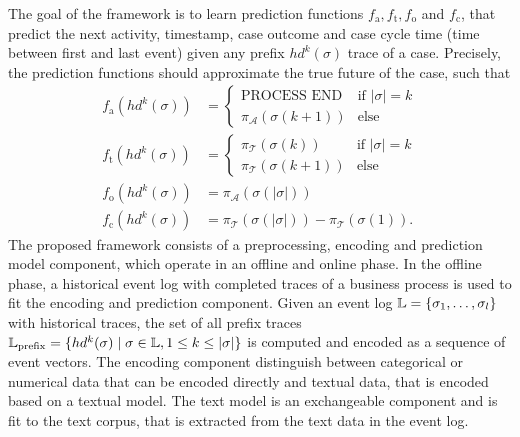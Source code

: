 The goal of the framework is to learn prediction functions $f_\mathrm{a}, f_\mathrm{t}, f_\mathrm{o}$ and $f_\mathrm{c}$, that predict the next activity, timestamp, case outcome and case cycle time (time between first and last event) given any prefix $hd^k(\sigma)$ trace of a case.
Precisely, the prediction functions should approximate the true future of the case, such that
\begin{align*}
f_\mathrm{a}(hd^k(\sigma)) &= 
\begin{cases}
\text{PROCESS END}& \text{if $|\sigma| = k$} \\
\pi_\mathcal{A}(\sigma(k+1)) & \text{else} 
\end{cases}\\
f_\mathrm{t}(hd^k(\sigma)) &=
\begin{cases}
\pi_\mathcal{T}(\sigma(k))& \text{if $|\sigma| = k$} \\
\pi_\mathcal{T}(\sigma(k+1)) & \text{else} 
\end{cases}\\
f_\mathrm{o}(hd^k(\sigma)) &= \pi_\mathcal{A}(\sigma(|\sigma|))\\
f_\mathrm{c}(hd^k(\sigma)) &=  \pi_\mathcal{T}(\sigma(|\sigma|))-  \pi_\mathcal{T}(\sigma(1)).
\end{align*}
The proposed framework consists of a preprocessing, encoding and prediction model component, which operate in an offline and online phase.
In the offline phase, a historical event log with completed traces of a business process is used to fit the encoding and prediction component.
Given an event log $\mathbb{L} = \{\sigma_1, \dots, \sigma_l\}$ with historical traces, the set of all prefix traces $\mathbb{L}_\mathrm{prefix} = \{ hd^k(\sigma) \mid  \sigma \in \mathbb{L}, 1 \leq k \leq |\sigma|\}$ is computed and encoded as a sequence of event vectors.
The encoding component distinguish between categorical or numerical data that can be encoded directly and textual data, that is encoded based on a textual model.
The text model is an exchangeable component and is fit to the text corpus, that is extracted from the text data in the event log.

